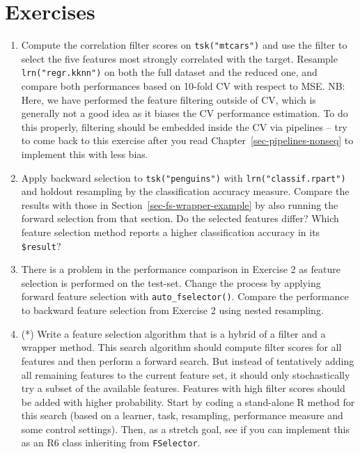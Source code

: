 \hypertarget{exercises-4}{%
\section{Exercises}\label{exercises-4}}

\begin{enumerate}
\def\labelenumi{\arabic{enumi}.}
\tightlist
\item
  Compute the correlation filter scores on \texttt{tsk("mtcars")} and
  use the filter to select the five features most strongly correlated
  with the target. Resample \texttt{lrn("regr.kknn")} on both the full
  dataset and the reduced one, and compare both performances based on
  10-fold CV with respect to MSE. NB: Here, we have performed the
  feature filtering outside of CV, which is generally not a good idea as
  it biases the CV performance estimation. To do this properly,
  filtering should be embedded inside the CV via pipelines -- try to
  come back to this exercise after you read
  Chapter~\ref{sec-pipelines-nonseq} to implement this with less bias.
\item
  Apply backward selection to \texttt{tsk("penguins")} with
  \texttt{lrn("classif.rpart")} and holdout resampling by the
  classification accuracy measure. Compare the results with those in
  Section~\ref{sec-fs-wrapper-example} by also running the forward
  selection from that section. Do the selected features differ? Which
  feature selection method reports a higher classification accuracy in
  its \texttt{\$result}?
\item
  There is a problem in the performance comparison in Exercise 2 as
  feature selection is performed on the test-set. Change the process by
  applying forward feature selection with \texttt{auto\_fselector()}.
  Compare the performance to backward feature selection from Exercise 2
  using nested resampling.
\item
  (*) Write a feature selection algorithm that is a hybrid of a filter
  and a wrapper method. This search algorithm should compute filter
  scores for all features and then perform a forward search. But instead
  of tentatively adding all remaining features to the current feature
  set, it should only stochastically try a subset of the available
  features. Features with high filter scores should be added with higher
  probability. Start by coding a stand-alone R method for this search
  (based on a learner, task, resampling, performance measure and some
  control settings). Then, as a stretch goal, see if you can implement
  this as an R6 class inheriting from \texttt{FSelector}.
\end{enumerate}
